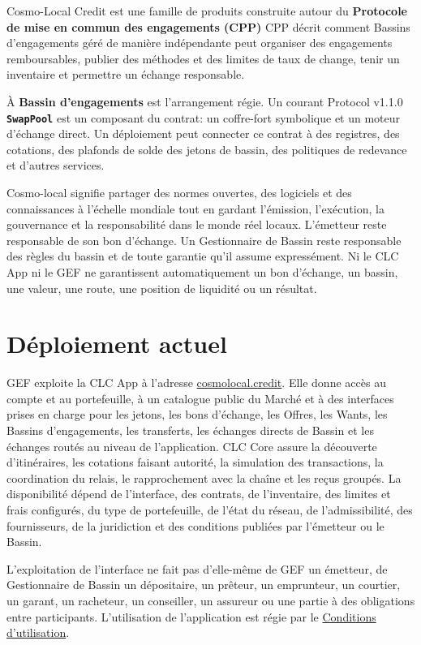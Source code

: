 \documentclass[11pt]{article}
\begin{document}
Cosmo-Local Credit est une famille de produits construite autour du \textbf{Protocole de mise en commun des engagements (CPP)} CPP décrit comment Bassins d'engagements géré de manière indépendante peut organiser des engagements remboursables, publier des méthodes et des limites de taux de change, tenir un inventaire et permettre un échange responsable.

À \textbf{Bassin d'engagements } est l'arrangement régie. Un courant Protocol v1.1.0 \textbf{\texttt{SwapPool}} est un composant du contrat: un coffre-fort symbolique et un moteur d'échange direct. Un déploiement peut connecter ce contrat à des registres, des cotations, des plafonds de solde des jetons de bassin, des politiques de redevance et d'autres services.

Cosmo-local signifie partager des normes ouvertes, des logiciels et des connaissances à l'échelle mondiale tout en gardant l'émission, l'exécution, la gouvernance et la responsabilité dans le monde réel locaux. L'émetteur reste responsable de son bon d'échange. Un Gestionnaire de Bassin reste responsable des règles du bassin et de toute garantie qu'il assume expressément. Ni le CLC App ni le GEF ne garantissent automatiquement un bon d'échange, un bassin, une valeur, une route, une position de liquidité ou un résultat.

\section*{Déploiement actuel}

GEF exploite la CLC App à l'adresse \href{https://cosmolocal.credit}{cosmolocal.credit}. Elle donne accès au compte et au portefeuille, à un catalogue public du Marché et à des interfaces prises en charge pour les jetons, les bons d'échange, les Offres, les Wants, les Bassins d'engagements, les transferts, les échanges directs de Bassin et les échanges routés au niveau de l'application. CLC Core assure la découverte d'itinéraires, les cotations faisant autorité, la simulation des transactions, la coordination du relais, le rapprochement avec la chaîne et les reçus groupés. La disponibilité dépend de l'interface, des contrats, de l'inventaire, des limites et frais configurés, du type de portefeuille, de l'état du réseau, de l'admissibilité, des fournisseurs, de la juridiction et des conditions publiées par l'émetteur ou le Bassin.

L'exploitation de l'interface ne fait pas d'elle-même de GEF un émetteur, de Gestionnaire de Bassin un dépositaire, un prêteur, un emprunteur, un courtier, un garant, un racheteur, un conseiller, un assureur ou une partie à des obligations entre participants. L'utilisation de l'application est régie par le \href{https://docs.cosmolocal.credit/fr/governance/terms}{Conditions d'utilisation}.
\end{document}
